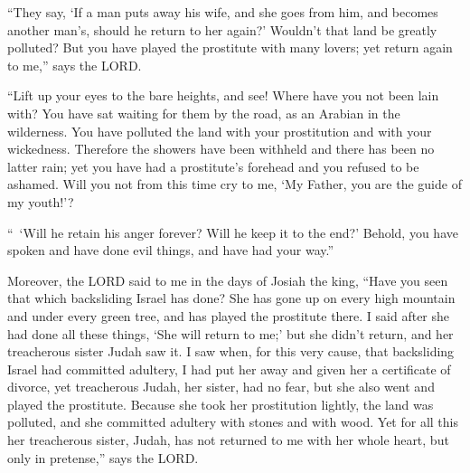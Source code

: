 \mychapter{} \myverse*{}“They say, ‘If a man puts away his wife, and she goes from him, and becomes another man’s, should he return to her again?’ Wouldn’t that land be greatly polluted? But you have played the prostitute with many lovers; yet return again to me,” says the LORD.


\myverse{}“Lift up your eyes to the bare heights, and see! Where have you not been lain with? You have sat waiting for them by the road, as an Arabian in the wilderness. You have polluted the land with your prostitution and with your wickedness. \myverse{}Therefore the showers have been withheld and there has been no latter rain; yet you have had a prostitute’s forehead and you refused to be ashamed. \myverse{}Will you not from this time cry to me, ‘My Father, you are the guide of my youth!’?


\myverse{}“ ‘Will he retain his anger forever? Will he keep it to the end?’
Behold, you have spoken and have done evil things, and have had your way.”


\myverse{}Moreover, the LORD said to me in the days of Josiah the king, “Have you seen that which backsliding Israel has done? She has gone up on every high mountain and under every green tree, and has played the prostitute there. \myverse{}I said after she had done all these things, ‘She will return to me;’ but she didn’t return, and her treacherous sister Judah saw it. \myverse{}I saw when, for this very cause, that backsliding Israel had committed adultery, I had put her away and given her a certificate of divorce, yet treacherous Judah, her sister, had no fear, but she also went and played the prostitute. \myverse{}Because she took her prostitution lightly, the land was polluted, and she committed adultery with stones and with wood. \myverse{}Yet for all this her treacherous sister, Judah, has not returned to me with her whole heart, but only in pretense,” says the LORD.


